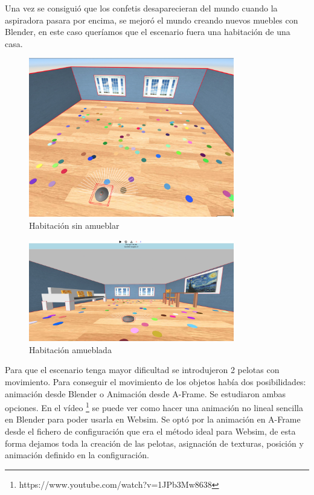 Una vez se consiguió que los confetis desaparecieran del mundo cuando la aspiradora pasara por encima, se mejoró el mundo creando nuevos muebles con Blender, en este caso queríamos que el escenario fuera una habitación de una casa.

\begin{figure}[H]
\centering
\includegraphics[width=0.8\textwidth, height=0.4\textwidth]{chapters/images/habitacionsin.png}
\caption{Habitación sin amueblar}
\end{figure}

\begin{figure}[H]
\centering
\includegraphics[width=0.8\textwidth, height=0.4\textwidth]{chapters/images/habitacioncon.png}
\caption{Habitación amueblada}
\end{figure}

Para que el escenario tenga mayor dificultad se introdujeron 2 pelotas con movimiento. Para conseguir el movimiento de los objetos había dos posibilidades: animación desde Blender o Animación desde A-Frame. 
Se estudiaron ambas opciones. En el vídeo \footnote{https://www.youtube.com/watch?v=1JPb3Mw8638}  se puede ver como hacer una animación no lineal sencilla en Blender para poder usarla en Websim. Se optó por la animación en A-Frame desde el fichero de configuración que era el método ideal para Websim, de esta forma dejamos toda la creación de las pelotas, asignación de texturas, posición y  animación definido  en la configuración.

